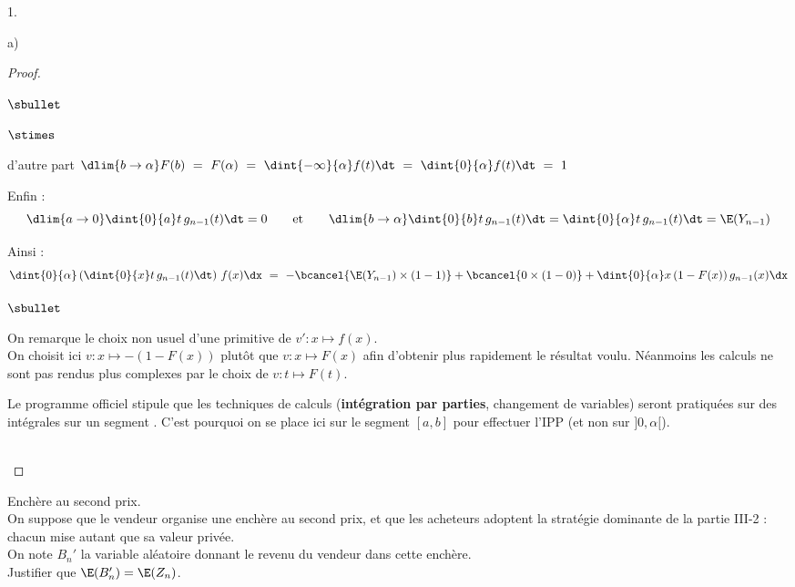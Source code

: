 \documentclass[11pt]{article}%
\begin{document}
\begin{noliste}{1.}
\begin{noliste}{a)}
\begin{proof}
\begin{noliste}{$\sbullet$}
\begin{noliste}{$\stimes$}
	\item d'autre part $\dlim{b\to \alpha} F(b) \ = \ F(\alpha) \ = 
	\ \dint{-\infty}{\alpha} f(t) \dt \ = \ 
	\dint{0}{\alpha} f(t) \dt \ = \ 1$
      \end{noliste}
      Enfin :
      \[
        \dlim{a\to 0} \dint{0}{a} t \, g_{n-1}(t) \dt = 0 \qquad 
        \text{et} \qquad \dlim{b\to \alpha} \dint{0}{b} t \, g_{n-1}(t) 
        \dt = \dint{0}{\alpha} t \, g_{n-1}(t) \dt = 
        \E(Y_{n-1})
      \]
      \item Ainsi : 
      \[
        \dint{0}{\alpha} \left(\dint{0}{x} t \, g_{n-1}(t) \dt \right)
        \, f(x) \dx \ = \ -\bcancel{\E(Y_{n-1}) \times (1-1)} + 
        \bcancel{0 \times (1-0)} + \dint{0}{\alpha} x \, (1-F(x))
        \, g_{n-1}(x) \dx
      \]
      \end{noliste}
      \conc{On en déduit : $\E(B_n) \ = \ n \, \dint{0}{\alpha} x \, 
      (1-F(x)) \, g_{n-1}(x) \dx$.}
      
      \begin{remark}
      \begin{noliste}{$\sbullet$}
        \item On remarque le choix non usuel d'une primitive de 
        $v': x \mapsto f(x)$.\\
        On choisit ici $v : x \mapsto -(1-F(x))$ plutôt que 
        $v:x \mapsto F(x)$ afin d'obtenir plus rapidement le résultat
        voulu. Néanmoins les calculs ne sont pas rendus plus 
        complexes par le choix de $v : t \mapsto F(t)$.
        \item Le programme officiel stipule que \og les techniques de 
        calculs ({\bf intégration par parties}, changement de variables)
        seront pratiquées sur des intégrales sur un segment \fg{}.
        C'est pourquoi on se place ici sur le segment $[a,b]$ pour 
        effectuer l'IPP (et non sur $]0, \alpha[$).
      \end{noliste}
      \end{remark}~\\[-1.4cm]
    \end{proof}
  \end{noliste}
  
  \item Enchère au second prix.\\
  On suppose que le vendeur organise une enchère au second prix, et que 
  les acheteurs adoptent la stratégie dominante de la partie III-2 : 
  chacun mise autant que sa valeur privée.\\
  On note $B_n'$ la variable aléatoire donnant le revenu du vendeur 
  dans cette enchère.\\
  Justifier que $\E(B_n') = \E(Z_n)$.
  

\end{noliste}
\end{document}
